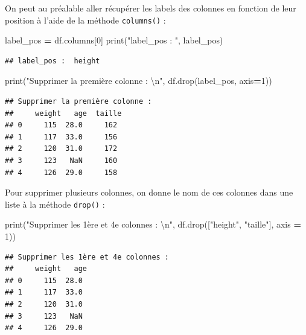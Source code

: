 \documentclass[
  12pt,
]{book}
\newenvironment{Shaded}{\begin{snugshade}}{\end{snugshade}}
\newcommand{\BuiltInTok}[1]{#1}
\newcommand{\CharTok}[1]{\textcolor[rgb]{0.31,0.60,0.02}{#1}}
\newcommand{\DecValTok}[1]{\textcolor[rgb]{0.00,0.00,0.81}{#1}}
\newcommand{\NormalTok}[1]{#1}
\newcommand{\OperatorTok}[1]{\textcolor[rgb]{0.81,0.36,0.00}{\textbf{#1}}}
\newcommand{\StringTok}[1]{\textcolor[rgb]{0.31,0.60,0.02}{#1}}
\numberwithin{equation}{section}
\numberwithin{countremarque}{section}
\begin{document}
On peut au préalable aller récupérer les labels des colonnes en fonction de leur position à l'aide de la méthode \texttt{columns()} :

\begin{Shaded}
\begin{Highlighting}[]
\NormalTok{label\_pos }\OperatorTok{=}\NormalTok{ df.columns[}\DecValTok{0}\NormalTok{]}
\BuiltInTok{print}\NormalTok{(}\StringTok{"label\_pos : "}\NormalTok{, label\_pos)}
\end{Highlighting}
\end{Shaded}

\begin{lstlisting}
## label_pos :  height
\end{lstlisting}

\begin{Shaded}
\begin{Highlighting}[]
\BuiltInTok{print}\NormalTok{(}\StringTok{"Supprimer la première colonne :  }\CharTok{\textbackslash{}n}\StringTok{"}\NormalTok{, df.drop(label\_pos, axis}\OperatorTok{=}\DecValTok{1}\NormalTok{))}
\end{Highlighting}
\end{Shaded}

\begin{lstlisting}
## Supprimer la première colonne :  
##     weight   age  taille
## 0     115  28.0     162
## 1     117  33.0     156
## 2     120  31.0     172
## 3     123   NaN     160
## 4     126  29.0     158
\end{lstlisting}

Pour supprimer plusieurs colonnes, on donne le nom de ces colonnes dans une liste à la méthode \texttt{drop()} :

\begin{Shaded}
\begin{Highlighting}[]
\BuiltInTok{print}\NormalTok{(}\StringTok{"Supprimer les 1ère et 4e colonnes :  }\CharTok{\textbackslash{}n}\StringTok{"}\NormalTok{, df.drop([}\StringTok{"height"}\NormalTok{, }\StringTok{"taille"}\NormalTok{], axis }\OperatorTok{=} \DecValTok{1}\NormalTok{))}
\end{Highlighting}
\end{Shaded}

\begin{lstlisting}
## Supprimer les 1ère et 4e colonnes :  
##     weight   age
## 0     115  28.0
## 1     117  33.0
## 2     120  31.0
## 3     123   NaN
## 4     126  29.0
\end{lstlisting}
\end{document}
